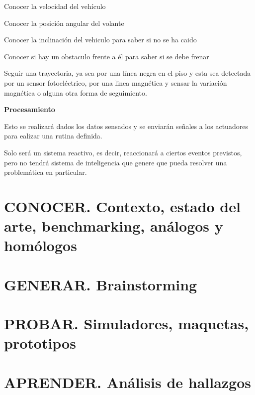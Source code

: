 Conocer la velocidad del vehículo

Conocer la posición angular del volante

Conocer la inclinación del vehiculo para saber si no se ha caido

Conocer si hay un obstaculo frente a él para saber si se debe frenar

Seguir una trayectoria, ya sea por una línea negra en el piso y esta sea detectada por un sensor fotoeléctrico, por una linea magnética y sensar la variación magnética o alguna otra forma de seguimiento.

\textbf{Procesamiento}

Esto se realizará dados los datos sensados y se enviarán señales a los actuadores para ealizar una rutina definida.

Solo será un sistema reactivo, es decir, reaccionará a ciertos eventos previstos, pero no tendrá sistema de inteligencia que genere que pueda resolver una problemática en particular.




\section{CONOCER. Contexto, estado del arte, benchmarking, análogos y homólogos}

\section{GENERAR. Brainstorming}

\section{PROBAR. Simuladores, maquetas, prototipos}

\section{APRENDER. Análisis de hallazgos}
